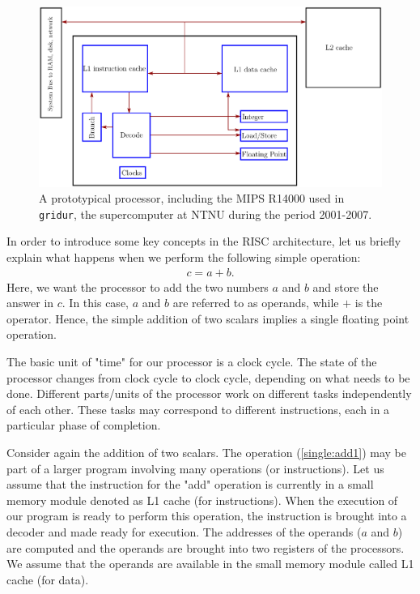 \documentclass[11pt]{article}
\begin{document}
 \begin{figure}[htbp]
  \begin{center}
    \includegraphics[scale=0.6]{Lande}
  \end{center}
  \caption{A prototypical processor, including the MIPS R14000 used in \texttt{gridur}, 
  the supercomputer at NTNU during the period 2001-2007. 
}
\label{fig:Lande}
\end{figure}

\clearpage

In order to introduce some key concepts in the RISC architecture, let us briefly 
explain what happens when we perform the following simple operation: 
\begin{align}
 c = a + b .
 \label{single:add1}
 \end{align}
 Here, we want the processor to add the two numbers $a$ and $b$ and store 
 the answer in $c$. In this case, $a$ and $b$ are referred to as operands,
 while $+$ is the operator. Hence, the simple addition of two scalars implies 
 a single floating point operation. 

The basic unit of "time" for our processor is a clock cycle. The state of the 
processor changes from  clock cycle to clock cycle, depending on what needs
to be done. Different parts/units of the processor work on different tasks
independently of each other. These tasks may correspond to different 
instructions, each in a particular phase of completion. 

Consider again the addition of two scalars.  The operation (\ref{single:add1})
may be part of a larger program involving many operations (or instructions). 
Let us assume that the instruction for the "add" operation is currently in a 
small memory module denoted as L1 cache (for instructions). 
When the execution of our program is ready to perform this operation, the 
instruction is brought into a decoder and made ready for execution. 
The addresses of the operands ($a$ and $b$) are computed and the 
operands are brought 
into two registers of the processors. We assume that the 
operands are available in the small memory module called L1 cache (for data).
\end{document}
